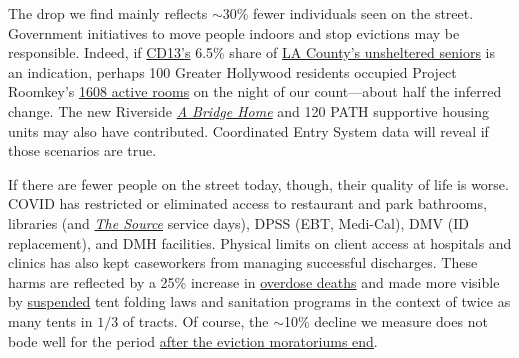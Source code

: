 \documentclass[11pt]{article}
\begin{document}
 The drop we find mainly reflects $\sim$30\% fewer individuals seen on the 
street. Government initiatives to move people indoors and stop evictions may be 
responsible. Indeed, if \href{https://www.lahsa.org/documents?id=4672-2020-homeless-count-council-district-13}{CD13's} 6.5\% share of \href{https://www.lahsa.org/documents?id=4585-2020-greater-los-angeles-homeless-count-los-angeles-continuum-of-care-coc-}{LA County's unsheltered seniors} is an indication, perhaps 
100 Greater Hollywood residents occupied Project Roomkey's 
\href{https://projectroomkeytracker.com/}{1608 active rooms} on the night of our count---about 
half the inferred change. The new Riverside \href{https://www.lamayor.org/ABridgeHome}
{\it A Bridge Home} and 120 PATH supportive housing units may also have contributed.
Coordinated Entry System data will reveal if those scenarios are true.

If there are fewer people on the street today, though, their quality of life is worse. 
COVID has restricted or eliminated access to restaurant and park bathrooms, libraries (and 
\href{https://www.lapl.org/homeless-resources/the-source}{\it The Source} service days), DPSS 
(EBT, Medi-Cal), DMV (ID replacement), and DMH facilities. Physical limits on client access at 
hospitals and clinics has also kept caseworkers from managing successful discharges. These harms 
are reflected by a 25\% increase in 
\href{https://www.latimes.com/california/story/2021-01-07/the-powerful-synthetic-opioid-fentanyl-is-behind-rising-deaths-in-the-homeless-population}{overdose deaths} and made more visible by \href{https://clkrep.lacity.org/onlinedocs/2020/20-0147_misc_3-17-20_p.pdf}{suspended}
tent folding laws and sanitation programs in the context of twice as many tents in $1/3$ of tracts.
Of course, the $\sim$10\% decline we measure does not bode well for the period \href{https://www.latimes.com/california/story/2021-01-12/new-report-foresees-tens-of-thousands-losing-homes-by-2023}
{after the eviction moratoriums end}.
\end{document}
